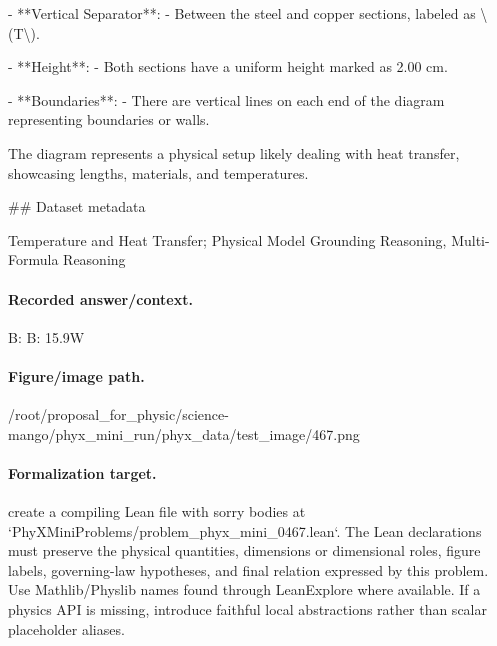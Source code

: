 - **Vertical Separator**: 
  - Between the steel and copper sections, labeled as \textbackslash{}(T\textbackslash{}).

- **Height**: 
  - Both sections have a uniform height marked as 2.00 cm.

- **Boundaries**: 
  - There are vertical lines on each end of the diagram representing boundaries or walls.

The diagram represents a physical setup likely dealing with heat transfer, showcasing lengths, materials, and temperatures.

\#\# Dataset metadata

Temperature and Heat Transfer; Physical Model Grounding Reasoning, Multi-Formula Reasoning

\paragraph{Recorded answer/context.}
B: B: 15.9W

\paragraph{Figure/image path.}
/root/proposal\_for\_physic/science-mango/phyx\_mini\_run/phyx\_data/test\_image/467.png

\paragraph{Formalization target.}
create a compiling Lean file with sorry bodies at `PhyXMiniProblems/problem\_phyx\_mini\_0467.lean`. The Lean declarations must preserve the physical quantities, dimensions or dimensional roles, figure labels, governing-law hypotheses, and final relation expressed by this problem.
Use Mathlib/Physlib names found through LeanExplore where available. If a physics API is missing, introduce faithful local abstractions rather than scalar placeholder aliases.

